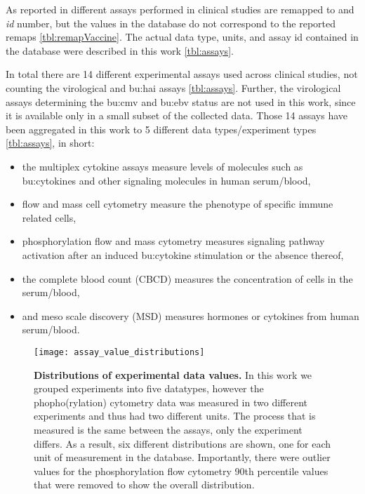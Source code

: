 As reported in \dpaper different assays performed in clinical studies are remapped to and \textit{id} number, but the values in the database do not correspond to the reported remaps \autoref{tbl:remapVaccine}.
The actual data type, units, and assay id contained in the database were described in this work \autoref{tbl:assays}.

In total there are 14 different experimental assays used across clinical studies, not counting the virological and \gls{bu:hai} assays \autoref{tbl:assays}.
Further, the virological assays determining the \gls{bu:cmv} and \gls{bu:ebv} status are not used in this work, since it is available only in a small subset of the collected data.
Those 14 assays have been aggregated in this work to 5 different data types/experiment types \autoref{tbl:assays}, in short:

\begin{itemize}
    \item the multiplex cytokine assays measure levels of molecules such as \gls{bu:cytokine}s and other signaling molecules in human serum/blood,
    \item flow and mass cell cytometry measure the phenotype of specific immune related cells,
    \item phosphorylation flow and mass cytometry measures signaling pathway activation after an induced \gls{bu:cytokine} stimulation or the absence thereof,
    \item the complete blood count (CBCD) measures the concentration of cells in the serum/blood,
    \item and meso scale discovery (MSD) measures hormones or cytokines from human serum/blood.
\end{itemize}

\begin{figure}[htpb]
    \texttt{[image: assay\_value\_distributions]}
    \caption{
        \textbf{Distributions of experimental data values.}
        In this work we grouped experiments into five datatypes, however the phopho(rylation) cytometry data was measured in two different experiments and thus had two different units.
        The process that is measured is the same between the assays, only the experiment differs.
        As a result, six different distributions are shown, one for each unit of measurement in the \flup database.
        Importantly, there were outlier values for the phosphorylation flow cytometry 90th percentile values that were removed to show the overall distribution.
    }\label{fig:assayDistr}
\end{figure}

